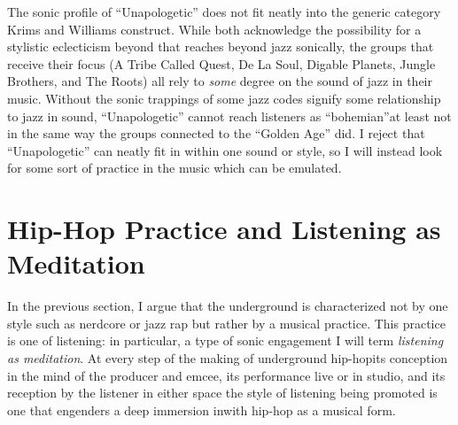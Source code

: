 The sonic profile of ``Unapologetic'' does not fit neatly into the generic category Krims and Williams
construct. While both acknowledge the possibility for a stylistic eclecticism beyond that reaches beyond
jazz sonically, the groups that receive their focus (A Tribe Called Quest, De La Soul, Digable Planets, 
Jungle Brothers, and The Roots) all rely to \emph{some} degree on the sound of jazz in their music. 
Without the sonic trappings of some jazz codes signify some relationship to jazz in sound, 
``Unapologetic'' cannot reach listeners as ``bohemian''\textemdash at least not in the same way 
the groups connected to the ``Golden Age'' did. I reject that ``Unapologetic'' can neatly
fit in within one sound or style, so I will instead look for some sort of practice in the music
which can be emulated.

\section{Hip-Hop Practice and Listening as Meditation} \label{listeningasmeditation}

In the previous section, I argue that the underground is characterized not by one style such as
nerdcore or jazz rap but rather by a musical practice. This practice is one of listening: in 
particular, a type of sonic engagement I will term \emph{listening as meditation}. At every step 
of the making of underground hip-hop\textemdash its conception in the mind of the producer and 
emcee, its performance live or in studio, and its reception by the listener in either space\textemdash 
the style of listening being promoted is one that engenders a deep immersion inwith hip-hop as 
a musical form.


